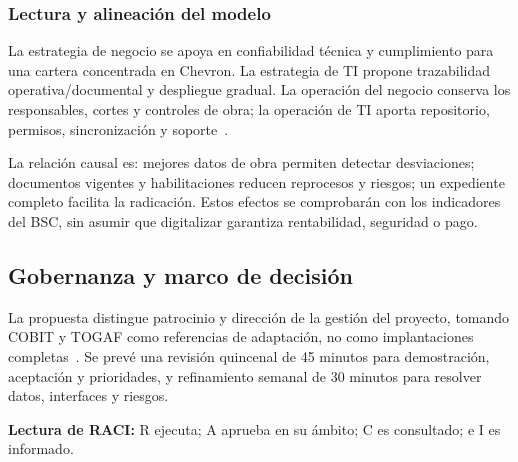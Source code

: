 \documentclass[12pt,letterpaper]{article}
\begin{document}
\subsubsection{Lectura y alineación del modelo}
La estrategia de negocio se apoya en confiabilidad técnica y cumplimiento para una cartera concentrada en Chevron. La estrategia de TI propone trazabilidad operativa/documental y despliegue gradual. La operación del negocio conserva los responsables, cortes y controles de obra; la operación de TI aporta repositorio, permisos, sincronización y soporte~\cite{chan-reich-2007}.

La relación causal es: mejores datos de obra permiten detectar desviaciones; documentos vigentes y habilitaciones reducen reprocesos y riesgos; un expediente completo facilita la radicación. Estos efectos se comprobarán con los indicadores del BSC, sin asumir que digitalizar garantiza rentabilidad, seguridad o pago.


\subsection{Gobernanza y marco de decisión}
\label{sec:gobernanza}
La propuesta distingue patrocinio y dirección de la gestión del proyecto, tomando COBIT y TOGAF como referencias de adaptación, no como implantaciones completas~\cite{cobit,togaf}. Se prevé una revisión quincenal de 45 minutos para demostración, aceptación y prioridades, y refinamiento semanal de 30 minutos para resolver datos, interfaces y riesgos.

\textbf{Lectura de RACI:} R ejecuta; A aprueba en su ámbito; C es consultado; e I es informado.
\end{document}
